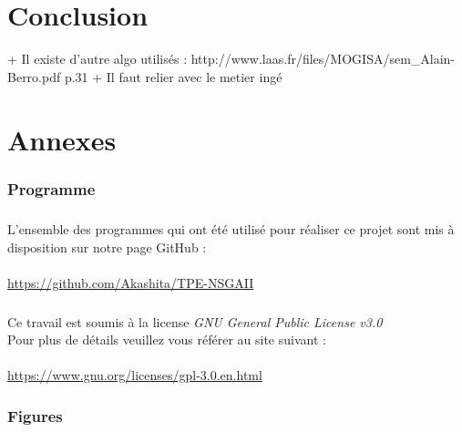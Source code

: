 \documentclass[12pt]{report}
\begin{document}
  \chapter{Conclusion}
   + Il existe d'autre algo utilisés : http://www.laas.fr/files/MOGISA/sem_Alain-Berro.pdf p.31
   + Il faut relier avec le metier ingé

  \appendix

  \nocite{*} %
  
  

  \chapter{Annexes}
    \subsection{Programme}
      \paragraph{}
      L'ensemble des programmes qui ont été utilisé pour réaliser ce projet sont mis à disposition sur notre page GitHub : \\\\
      \url{https://github.com/Akashita/TPE-NSGAII}

      \paragraph{}
      Ce travail est soumis à la license \emph{GNU General Public License v3.0}\\ %
      Pour plus de détails veuillez vous référer au site suivant : \\\\
      \url{https://www.gnu.org/licenses/gpl-3.0.en.html}

    \subsection{Figures}
\end{document}

